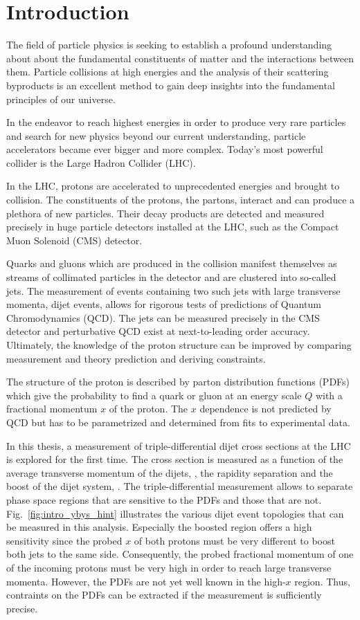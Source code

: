 
\chapter{Introduction}

The field of particle physics is seeking to establish a profound understanding
about about the fundamental constituents of matter and the interactions
between them. Particle collisions at high energies and the analysis of
their scattering byproducts is an excellent method to gain deep insights into
the fundamental principles of our universe.

In the endeavor to reach highest energies in order to produce very rare
particles and search for new physics beyond our current understanding, particle accelerators became ever bigger
and more complex. Today's most powerful collider is the Large Hadron Collider
(LHC).

In the LHC, protons are accelerated to unprecedented energies and brought to
collision. The constituents of the protons, the partons, interact and can
produce a plethora of new particles. Their decay products are detected and
measured precisely in huge particle detectors installed at the LHC, such as the
Compact Muon Solenoid (CMS) detector.

Quarks and gluons which are produced in the collision manifest themselves as
streams of collimated particles in the detector and are clustered into so-called
jets. The measurement of events containing two such jets with large
transverse momenta, dijet events, allows for rigorous tests of predictions of
Quantum Chromodynamics (QCD). The jets can be measured precisely in the CMS
detector and perturbative QCD exist at next-to-leading order accuracy.
Ultimately, the knowledge of the proton structure can be improved by comparing
measurement and theory prediction and deriving constraints.

The structure of the proton is described by parton distribution functions (PDFs) which
give the probability to find a quark or gluon at an energy scale $Q$ with a fractional
momentum $x$ of the proton. The $x$ dependence is not predicted by QCD but has
to be parametrized and determined from fits to experimental data.

In this thesis, a measurement of triple-differential dijet cross sections at the
LHC is explored for the first time. The cross section is measured as a function
of the average transverse momentum of the dijets, \ptavg, the rapidity
separation \ystar and the boost of the dijet system, \yboost. The
triple-differential measurement allows to separate phase space regions that are
sensitive to the PDFs and those that are not.  Fig.~\ref{fig:intro_ybys_hint}
illustrates the various dijet event topologies that can be measured in this
analysis. Especially the boosted region offers a high sensitivity since the
probed $x$ of both protons must be very different to boost both jets to the same
side. Consequently, the probed fractional momentum of one of the incoming
protons must be very high in order to reach large transverse momenta. However,
the PDFs are not yet well known in the high-$x$ region. Thus, contraints on the
PDFs can be extracted if the measurement is sufficiently precise.

